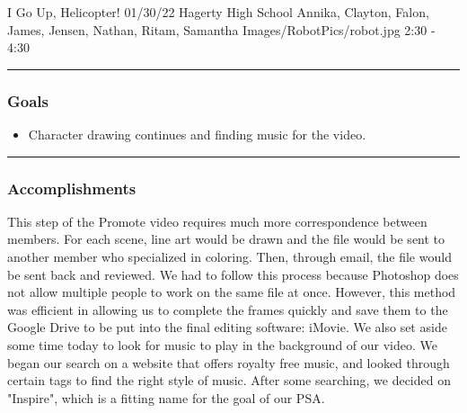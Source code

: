 \insertmeeting 
	{I Go Up, Helicopter!} 
	{01/30/22} 
	{Hagerty High School}
	{Annika, Clayton, Falon, James, Jensen, Nathan, Ritam, Samantha}
	{Images/RobotPics/robot.jpg}
	{2:30 - 4:30}
	
\noindent\hfil\rule{\textwidth}{.4pt}\hfil
\subsubsection*{Goals}
\begin{itemize}
    \item Character drawing continues and finding music for the video.

\end{itemize} 

\noindent\hfil\rule{\textwidth}{.4pt}\hfil

\subsubsection*{Accomplishments}
This step of the Promote video requires much more correspondence between members. For each scene, line art would be drawn and the file would be sent to another member who specialized in coloring. Then, through email, the file would be sent back and reviewed. We had to follow this process because Photoshop does not allow multiple people to work on the same file at once. However, this method was efficient in allowing us to complete the frames quickly and save them to the Google Drive to be put into the final editing software: iMovie. We also set aside some time today to look for music to play in the background of our video. We began our search on a website that offers royalty free music, and looked through certain tags to find the right style of music. After some searching, we decided on "Inspire", which is a fitting name for the goal of our PSA. 
 

